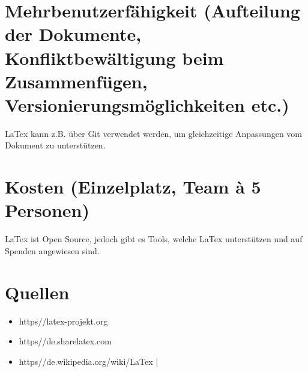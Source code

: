 \documentclass{article}
\begin{document}
\section{Mehrbenutzerfähigkeit (Aufteilung der Dokumente, Konfliktbewältigung beim Zusammenfügen,
Versionierungsmöglichkeiten etc.)}
LaTex kann z.B. über Git verwendet werden, um gleichzeitige Anpassungen vom Dokument zu unterstützen.

\section{Kosten (Einzelplatz, Team à 5 Personen)}
LaTex ist Open Source, jedoch gibt es Tools, welche LaTex unterstützen und auf Spenden angewiesen sind.

\section{Quellen}
\begin{itemize}
	\item https//latex-projekt.org
	\item https//de.sharelatex.com
	\item https//de.wikipedia.org/wiki/LaTex
|\end{itemize}
\end{document}
